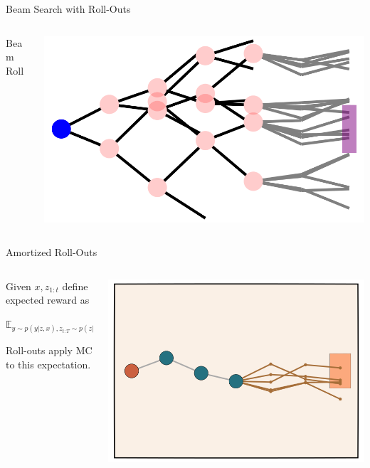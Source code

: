 \documentclass[14pt,aspectratio=169]{beamer}
\begin{document}
\begin{frame}{Beam Search with Roll-Outs}
	\begin{columns}
		\begin{column}{0.5\linewidth}
			Beam Roll
		\end{column}
		\begin{column}{0.5\linewidth}
			\includegraphics[width=\textwidth]{images/beamroll.png}
		\end{column}
	\end{columns}
\end{frame}


\begin{frame}{Amortized Roll-Outs}
	\begin{columns}
		\begin{column}{0.5\linewidth}
			Given $x, z_{1:t}$ define expected reward as

			$\mathbb{E}_{y\sim p(y| z, x), z_{t:T} \sim p(z | z_{1:t}, x)}[Ver(y)]$

			Roll-outs apply MC to this expectation.
		\end{column}
		\begin{column}{0.5\linewidth}
			\includegraphics[width=\textwidth]{images/mcroll.png}
		\end{column}
	\end{columns}
\end{frame}
\end{document}
